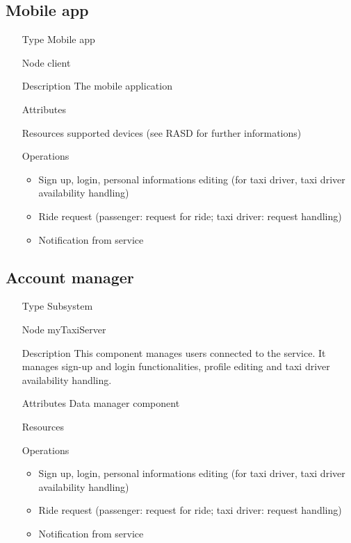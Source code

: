 \subsection{Mobile app}
\begin{itemize}
	\item[Type] Mobile app
	\item[Node] client
	\item[Description] The mobile application 
	\item[Attributes]
	\item[Resources] supported devices (see RASD for further informations)
	\item[Operations] \begin{itemize}
		\item Sign up, login, personal informations editing (for taxi driver, taxi driver availability handling)
		\item Ride request (passenger: request for ride; taxi driver: request handling)
		\item Notification from service
	\end{itemize}
\end{itemize}

\subsection{Account manager}
\begin{itemize}
	\item[Type] Subsystem
	\item[Node] myTaxiServer
	\item[Description] This component manages users connected to the service. It manages sign-up and login functionalities, profile editing and taxi driver availability handling.
	\item[Attributes] Data manager component
	\item[Resources] 
	\item[Operations] \begin{itemize}
		\item Sign up, login, personal informations editing (for taxi driver, taxi driver availability handling)
		\item Ride request (passenger: request for ride; taxi driver: request handling)
		\item Notification from service
	\end{itemize}
\end{itemize}

